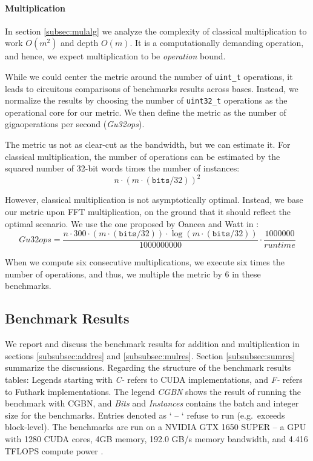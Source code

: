 \paragraph{Multiplication}
In section \ref{subsec:mulalg} we analyze the complexity of classical
multiplication to work $O(m^2)$ and depth $O(m)$. It is a computationally
demanding operation, and hence, we expect multiplication to be
\textit{operation} bound.

While we could center the metric around the number of \texttt{uint\_t}
operations, it leads to circuitous comparisons of benchmarks results across
bases. Instead, we normalize the results by choosing the number of
\texttt{uint32\_t} operations as the operational core for our metric. We then
define the metric as the number of gigaoperations per second (\textit{Gu32ops}).

The metric us not as clear-cut as the bandwidth, but we can estimate it. For
classical multiplication, the number of operations can be estimated by the
squared number of 32-bit words times the number of instances:
\begin{equation}
  \label{eq:u32opsobs}
  {n \cdot (m \cdot (\mathtt{bits} / 32))^2}
\end{equation}

However, classical multiplication is not asymptotically optimal. Instead, we
base our metric upon FFT multiplication, on the ground that it should reflect
the optimal scenario. We use the one proposed by Oancea and Watt in
\cite{oancea2024gpu}:
\begin{equation}
  \label{eq:u32ops}
  \mathit{Gu32ops} = \dfrac{n \cdot 300 \cdot (m \cdot (\mathtt{bits} / 32)) \cdot \log (m \cdot (\mathtt{bits} / 32))}{1000000000} \cdot \dfrac{1000000}{\mathit{runtime}}
\end{equation}

When we compute six consecutive multiplications, we execute six times the number
of operations, and thus, we multiple the metric by 6 in these benchmarks.

\subsection{Benchmark Results}
\label{subsec:benchres}

We report and discuss the benchmark results for addition and multiplication in
sections \ref{subsubsec:addres} and \ref{subsubsec:mulres}. Section
\ref{subsubsec:sumres} summarize the discussions. Regarding the structure of the
benchmark results tables: Legends starting with \textit{C-} refers to CUDA
implementations, and \textit{F-} refers to Futhark implementations. The legend
\textit{CGBN} shows the result of running the benchmark with CGBN, and
\textit{Bits} and \textit{Instances} contains the batch and integer size for the
benchmarks. Entries denoted as ` -- ` refuse to run (e.g.\ exceeds
block-level). The benchmarks are run on a NVIDIA GTX 1650 SUPER -- a GPU with
1280 CUDA cores, 4GB memory, 192.0 GB/s memory bandwidth, and 4.416 TFLOPS
compute power \cite{gpuspecs}.

